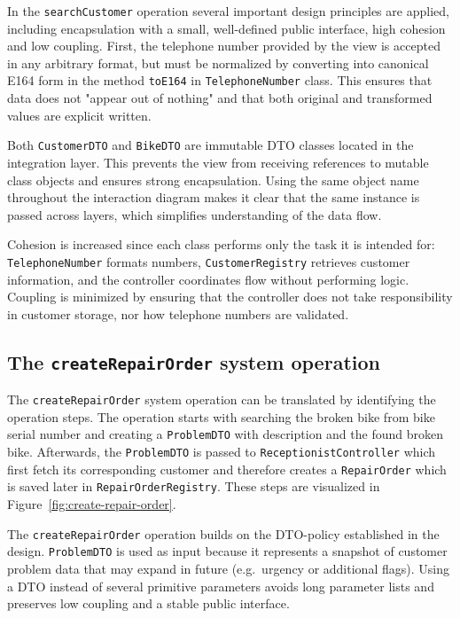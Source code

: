 \documentclass[a4paper]{scrartcl}
\begin{document}
In the \texttt{searchCustomer} operation several important design principles are applied, including encapsulation with a small, well-defined public interface, high cohesion and low coupling. First, the telephone number provided by the view is accepted in any arbitrary format, but must be normalized by converting into canonical E164 form in the method \texttt{toE164} in \texttt{TelephoneNumber} class. This ensures that data does not "appear out of nothing" and that both original and transformed values are explicit written.

Both \texttt{CustomerDTO} and \texttt{BikeDTO} are immutable DTO classes located in the integration layer. This prevents the view from receiving references to mutable class objects and ensures strong encapsulation. Using the same object name throughout the interaction diagram makes it clear that the same instance is passed across layers, which simplifies understanding of the data flow.

Cohesion is increased since each class performs only the task it is intended for: \texttt{TelephoneNumber} formats numbers, \texttt{CustomerRegistry} retrieves customer information, and the controller coordinates flow without performing logic. Coupling is minimized by ensuring that the controller does not take responsibility in customer storage, nor how telephone numbers are validated.



\subsection{The \texttt{createRepairOrder} system operation}

The \texttt{createRepairOrder} system operation can be translated by identifying the operation steps. The operation starts with searching the broken bike from bike serial number and creating a \texttt{ProblemDTO} with description and the found broken bike. Afterwards, the \texttt{ProblemDTO} is passed to \texttt{ReceptionistController} which first fetch its corresponding customer and therefore creates a \texttt{RepairOrder} which is saved later in \texttt{RepairOrderRegistry}. These steps are visualized in Figure~\ref{fig:create-repair-order}.

The \texttt{createRepairOrder} operation builds on the DTO-policy established in the design. \texttt{ProblemDTO} is used as input because it represents a snapshot of customer problem data that may expand in future (e.g.\ urgency or additional flags). Using a DTO instead of several primitive parameters avoids long parameter lists and preserves low coupling and a stable public interface.
\end{document}
